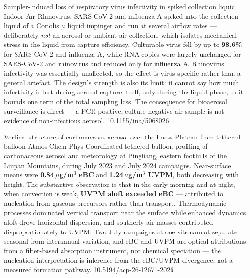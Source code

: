 \documentclass[10pt]{article}
\begin{document}
{Sampler-induced loss of respiratory virus infectivity in spiked collection liquid}
{Indoor Air}
{Rhinovirus, SARS-CoV-2 and influenza A spiked into the collection liquid of a Coriolis
$\mu$ liquid impinger and run at several airflow rates --- deliberately \emph{not} an aerosol
or ambient-air collection, which isolates mechanical stress in the liquid from capture
efficiency. Culturable virus fell by up to \textbf{98.6\%} for SARS-CoV-2 and influenza A,
while RNA copies were largely unchanged for SARS-CoV-2 and rhinovirus and reduced only for
influenza A. Rhinovirus infectivity was essentially unaffected, so the effect is
virus-specific rather than a general artefact. The design's strength is also its limit: it
cannot say how much infectivity is lost during aerosol capture itself, only during the liquid
phase, so it bounds one term of the total sampling loss. The consequence for bioaerosol
surveillance is direct --- a PCR-positive, culture-negative air sample is not evidence of
non-infectious aerosol.}
{10.1155/ina/5068026}


{Vertical structure of carbonaceous aerosol over the Loess Plateau from tethered balloon}
{Atmos Chem Phys}
{Coordinated tethered-balloon profiling of carbonaceous aerosol and meteorology at Pingliang,
eastern foothills of the Liupan Mountains, during July 2023 and July 2024 campaigns.
Near-surface means were \textbf{0.84\,$\mu$g/m$^3$ eBC} and \textbf{1.24\,$\mu$g/m$^3$ UVPM},
both decreasing with height. The substantive observation is that in the early morning and at
night, when convection is weak, \textbf{UVPM aloft exceeded eBC} --- attributed to nucleation
from gaseous precursors rather than transport. Thermodynamic processes dominated vertical
transport near the surface while enhanced dynamics aloft drove horizontal dispersion, and
southerly air masses contributed disproportionately to UVPM. Two July campaigns at one site
cannot separate seasonal from interannual variation, and eBC and UVPM are optical
attributions from a filter-based absorption instrument, not chemical speciation --- the
nucleation interpretation is inference from the eBC/UVPM divergence, not a measured
formation pathway.}
{10.5194/acp-26-12671-2026}
\end{document}
